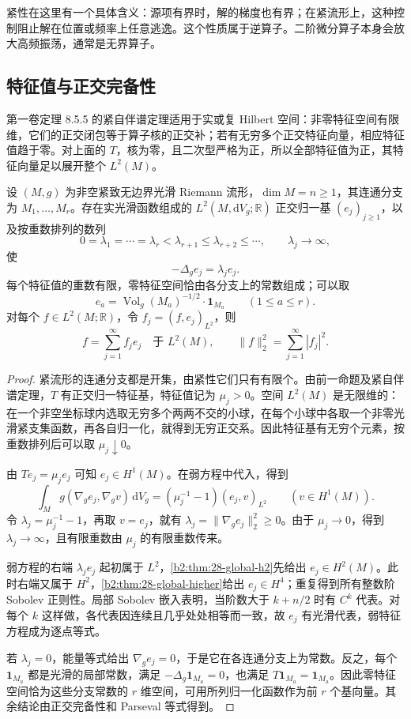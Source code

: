 紧性在这里有一个具体含义：源项有界时，解的梯度也有界；在紧流形上，这种控制阻止解在位置或频率上任意逃逸。这个性质属于逆算子。二阶微分算子本身会放大高频振荡，通常是无界算子。

\subsection{特征值与正交完备性}
\label{b2:subsec:260502}

第一卷定理 8.5.5 的紧自伴谱定理适用于实或复 Hilbert 空间：非零特征空间有限维，它们的正交闭包等于算子核的正交补；若有无穷多个正交特征向量，相应特征值趋于零。对上面的 \(T\)，核为零，且二次型严格为正，所以全部特征值为正，其特征向量足以展开整个 \(L^2(M)\)。

\begin{theorem}\label{b2:thm:26-laplace-spectrum}
设 \((M,g)\) 为非空紧致无边界光滑 Riemann 流形，\(\dim M=n\geq1\)，其连通分支为 \(M_1,\ldots,M_r\)。存在实光滑函数组成的 \(L^2(M,\mathrm dV_g;\mathbb R)\) 正交归一基 \((e_j)_{j\geq1}\)，以及按重数排列的数列
\[
 0=\lambda_1=\cdots=\lambda_r<\lambda_{r+1}\leq\lambda_{r+2}\leq\cdots,
 \qquad \lambda_j\longrightarrow\infty,
\]
使
\[
 -\Delta_g e_j=\lambda_j e_j.
\]
每个特征值的重数有限，零特征空间恰由各分支上的常数组成；可以取
\[
 e_a=\operatorname{Vol}_g(M_a)^{-1/2}\cdot\mathbf1_{M_a}
 \qquad(1\leq a\leq r).
\]
对每个 \(f\in L^2(M;\mathbb R)\)，令 \(f_j=(f,e_j)_{L^2}\)，则
\[
 f=\sum_{j=1}^\infty f_je_j\quad\text{于 }L^2(M),\qquad
 \|f\|_2^2=\sum_{j=1}^\infty|f_j|^2.
\]
\end{theorem}
\begin{proof}
紧流形的连通分支都是开集，由紧性它们只有有限个。由前一命题及紧自伴谱定理，\(T\) 有正交归一特征基，特征值记为 \(\mu_j>0\)。空间 \(L^2(M)\) 是无限维的：在一个非空坐标球内选取无穷多个两两不交的小球，在每个小球中各取一个非零光滑紧支集函数，再各自归一化，就得到无穷正交系。因此特征基有无穷个元素，按重数排列后可以取 \(\mu_j\downarrow0\)。

由 \(Te_j=\mu_je_j\) 可知 \(e_j\in H^1(M)\)。在弱方程中代入，得到
\[
 \int_Mg(\nabla_g e_j,\nabla_g v)\,\mathrm dV_g
   =(\mu_j^{-1}-1)(e_j,v)_{L^2}\qquad(v\in H^1(M)).
\]
令 \(\lambda_j=\mu_j^{-1}-1\)，再取 \(v=e_j\)，就有
\(\lambda_j=\|\nabla_g e_j\|_2^2\geq0\)。由于 \(\mu_j\to0\)，得到 \(\lambda_j\to\infty\)，且有限重数由 \(\mu_j\) 的有限重数传来。

弱方程的右端 \(\lambda_je_j\) 起初属于 \(L^2\)，\cref{b2:thm:28-global-h2}先给出 \(e_j\in H^2(M)\)。此时右端又属于 \(H^2\)，\cref{b2:thm:28-global-higher}给出 \(e_j\in H^4\)；重复得到所有整数阶 Sobolev 正则性。局部 Sobolev 嵌入表明，当阶数大于 \(k+n/2\) 时有 \(C^k\) 代表。对每个 \(k\) 这样做，各代表因连续且几乎处处相等而一致，故 \(e_j\) 有光滑代表，弱特征方程成为逐点等式。

若 \(\lambda_j=0\)，能量等式给出 \(\nabla_g e_j=0\)，于是它在各连通分支上为常数。反之，每个 \(\mathbf1_{M_a}\) 都是光滑的局部常数，满足 \(-\Delta_g\mathbf1_{M_a}=0\)，也满足 \(T\mathbf1_{M_a}=\mathbf1_{M_a}\)。因此零特征空间恰为这些分支常数的 \(r\) 维空间，可用所列归一化函数作为前 \(r\) 个基向量。其余结论由正交完备性和 Parseval 等式得到。
\end{proof}

